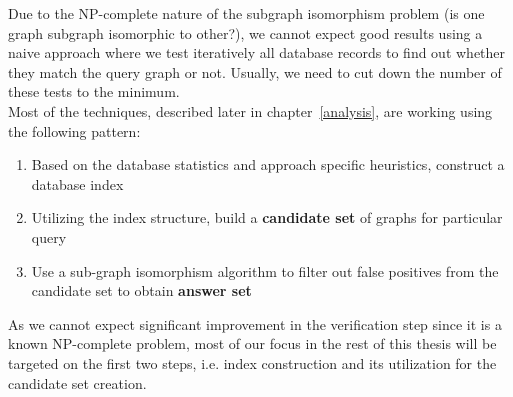 Due to the NP-complete nature of the subgraph isomorphism problem (is one graph subgraph isomorphic to other?), we cannot expect good results using a naive approach where we test iteratively all database records to find out whether they match the query graph or not. Usually, we need to cut down the number of these tests to the minimum.\\


Most of the techniques, described later in chapter~\ref{analysis}, are working using the following pattern:
\begin{enumerate}
	\item Based on the database statistics and approach specific heuristics, construct a database index
	\item Utilizing the index structure, build a \textbf{candidate set} of graphs for particular query
	\item Use a sub-graph isomorphism algorithm to filter out false positives from the candidate set to obtain \textbf{answer set}
\end{enumerate}


As we cannot expect significant improvement in the verification step since it is a known NP-complete problem, most of our focus in the rest of this thesis will be targeted on the first two steps, i.e. index construction and its utilization for the candidate set creation.